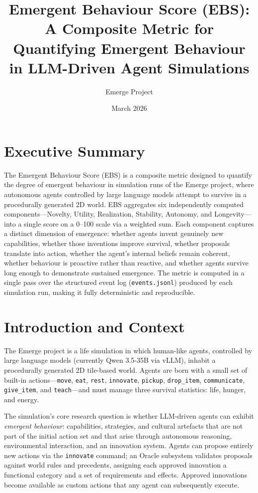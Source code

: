 \documentclass[a4paper, 11pt]{article}
\title{%
    \textbf{Emergent Behaviour Score (EBS)}:\\[0.5em]
    \Large A Composite Metric for Quantifying Emergent Behaviour\\
    in LLM-Driven Agent Simulations%
}
\author{Emerge Project}
\date{March 2026}
\begin{document}
\maketitle
\tableofcontents
\newpage

\section{Executive Summary}

The Emergent Behaviour Score (EBS) is a composite metric designed to quantify the degree of emergent behaviour in simulation runs of the Emerge project, where autonomous agents controlled by large language models attempt to survive in a procedurally generated 2D world. EBS aggregates six independently computed components---Novelty, Utility, Realization, Stability, Autonomy, and Longevity---into a single score on a 0--100 scale via a weighted sum. Each component captures a distinct dimension of emergence: whether agents invent genuinely new capabilities, whether those inventions improve survival, whether proposals translate into action, whether the agent's internal beliefs remain coherent, whether behaviour is proactive rather than reactive, and whether agents survive long enough to demonstrate sustained emergence. The metric is computed in a single pass over the structured event log (\texttt{events.jsonl}) produced by each simulation run, making it fully deterministic and reproducible.

\section{Introduction and Context}

The Emerge project is a life simulation in which human-like agents, controlled by large language models (currently Qwen 3.5-35B via vLLM), inhabit a procedurally generated 2D tile-based world. Agents are born with a small set of built-in actions---\texttt{move}, \texttt{eat}, \texttt{rest}, \texttt{innovate}, \texttt{pickup}, \texttt{drop\_item}, \texttt{communicate}, \texttt{give\_item}, and \texttt{teach}---and must manage three survival statistics: life, hunger, and energy.

The simulation's core research question is whether LLM-driven agents can exhibit \emph{emergent behaviour}: capabilities, strategies, and cultural artefacts that are not part of the initial action set and that arise through autonomous reasoning, environmental interaction, and an innovation system. Agents can propose entirely new actions via the \texttt{innovate} command; an Oracle subsystem validates proposals against world rules and precedents, assigning each approved innovation a functional category and a set of requirements and effects. Approved innovations become available as custom actions that any agent can subsequently execute.
\end{document}
